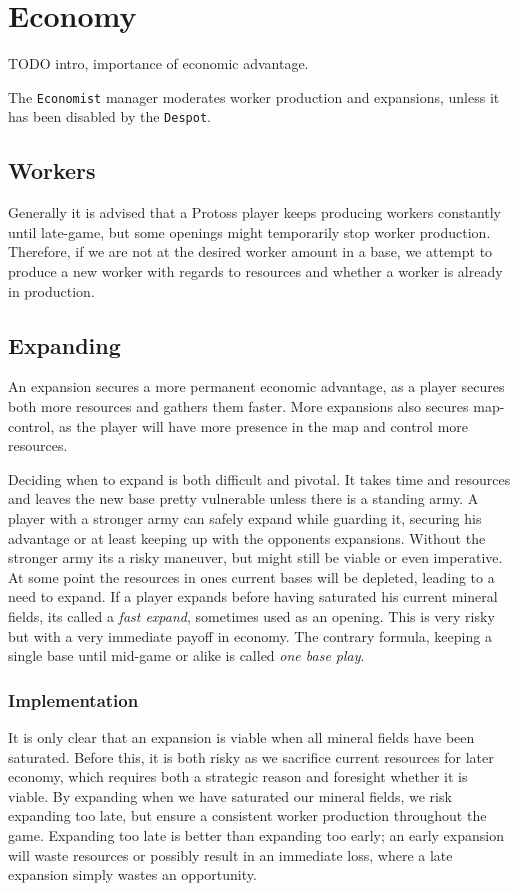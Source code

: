 \section{Economy}
TODO intro, importance of economic advantage.

The \texttt{Economist} manager moderates worker production and expansions, unless it has been disabled by the \texttt{Despot}.

	\subsection*{Workers}
	Generally it is advised that a Protoss player keeps producing workers constantly until late-game, but some openings might temporarily stop worker production. Therefore, if we are not at the desired worker amount in a base, we attempt to produce a new worker with regards to resources and whether a worker is already in production.
	
	\subsection*{Expanding}
	An expansion secures a more permanent economic advantage, as a player secures both more resources and gathers them faster. More expansions also secures map-control, as the player will have more presence in the map and control more resources.
	
	Deciding when to expand is both difficult and pivotal. It takes time and resources and leaves the new base pretty vulnerable unless there is a standing army. A player with a stronger army can safely expand while guarding it, securing his advantage or at least keeping up with the opponents expansions. Without the stronger army its a risky maneuver, but might still be viable or even imperative. At some point the resources in ones current bases will be depleted, leading to a need to expand. If a player expands before having saturated his current mineral fields, its called a \emph{fast expand}, sometimes used as an opening. This is very risky but with a very immediate payoff in economy. The contrary formula, keeping a single base until mid-game or alike is called \emph{one base play}.
	
		\subsubsection*{Implementation}
		It is only clear that an expansion is viable when all mineral fields have been saturated. Before this, it is both risky as we sacrifice current resources for later economy, which requires both a strategic reason and foresight whether it is viable. By expanding when we have saturated our mineral fields, we risk expanding too late, but ensure a consistent worker production throughout the game. Expanding too late is better than expanding too early; an early expansion will waste resources or possibly result in an immediate loss, where a late expansion simply wastes an opportunity.
		
